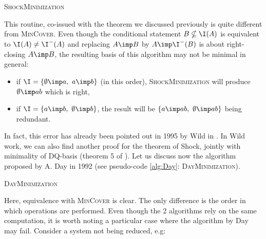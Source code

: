 \begin{algorithm}
	
	\BlankLine
	\BlankLine
	
	\caption{\textsc{ShockMinimization}}
	\label{alg:Shock}
\end{algorithm}

This routine, co-issued with the theorem we discussed previously is 
quite different from \textsc{MinCover}. Even though the conditional statement 
$B \nsubseteq \I(A)$ is equivalent to $\I(A) \neq \I^{-}(A)$ and 
replacing $A \imp B$ by $A \imp \I^{-}(B)$ is about right-closing $A \imp B$, 
the resulting basis of this algorithm may not be minimal in
general:
\begin{itemize}
	\item if $\I = \{ \emptyset \imp a, \ a \imp b \}$ (in this order), 
	\textsc{ShockMinimization} will produce $\emptyset \imp ab$ which is right,
	\item if $\I = \{ a \imp b, \ \emptyset \imp b \}$, the result will
	be $\{ a \imp ab, \ \emptyset \imp ab \}$ being redundant.
\end{itemize} 
In fact, this error has already been pointed out in 1995 by Wild in 
\cite{wild_computations_1995}. In Wild work, we can also find another proof
for the theorem of Shock, jointly with minimality of DQ-basis (theorem 5 of
\cite{wild_theory_1994, wild_computations_1995}). Let us discuss now the 
algorithm proposed by A. Day in 1992 (see pseudo-code \ref{alg:Day}: 
\textsc{DayMinimization}).

\begin{algorithm}
	
	\BlankLine
	\BlankLine
	
	
	\caption{\textsc{DayMinimization}}
	\label{alg:Day}
\end{algorithm}

\noindent Here, equivalence with \textsc{MinCover} is clear. The only difference
is the order in which operations are performed. Even though the 2 algorithms 
rely on the same computation, it is worth noting a particular case where the
algorithm by Day may fail. Consider a system not being reduced, e.g:

